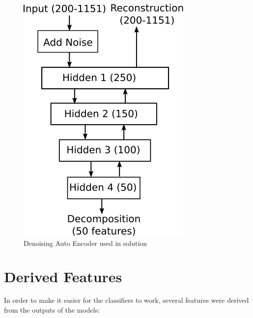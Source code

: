 \documentclass{article}
\begin{document}
\begin{figure}[ht]
\vskip 0.2in
\begin{center}
\centerline{\includegraphics{auto-encoder}}
\caption{Denoising Auto Encoder used in solution}
\label{figure:autoencoder}
\end{center}
\vskip -0.2in
\end{figure} 

\section{Derived Features}

In order to make it easier for the classifiers to work, several features were derived from the outputs of the models:
\end{document}
